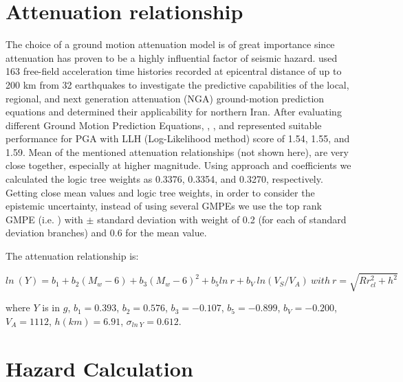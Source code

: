 \documentclass{article}
\begin{document}
\section{Attenuation relationship}
The choice of a ground motion attenuation model is of great importance since attenuation has proven to be a highly influential factor of seismic hazard. \citet{Zafarani2014} used 163 free-field acceleration time histories recorded at epicentral distance of up to 200 km from 32 earthquakes to investigate the predictive capabilities of the local, regional, and next generation attenuation (NGA) ground-motion prediction equations and determined their applicability for northern Iran. After evaluating different Ground Motion Prediction Equations, \citet{Kalkan2004}, \citet{Chiou2008}, and \citet{Boore2008} represented suitable performance for  PGA  with LLH (Log-Likelihood method) score of 1.54, 1.55, and 1.59. Mean of the mentioned attenuation relationships (not shown here), are very close together, especially at higher magnitude. Using \citet{Scherbaum2009} approach and \citet{Zafarani2014} coefficients we calculated the logic tree weights as 0.3376, 0.3354, and 0.3270, respectively. Getting close mean values and logic tree weights, in order to consider the epistemic uncertainty, instead of using several GMPEs we use the top rank GMPE (i.e.  \citet{Kalkan2004} ) with  $\pm$ standard deviation with weight of 0.2 (for each of standard deviation branches) and 0.6 for the mean value.    \\

\noindent

The attenuation relationship is:

\begin{equation}
ln\ (Y) = b_1 + b_2(M_w-6) + b_3( M_w-6)^{2}+ b_5ln\ r + b_V \ ln(V_S/V_A) \  with \  r= \sqrt{R{r^2_{cl} + h^2}}  
\end{equation}

where $Y$ is in $g$, $b_1 = 0.393$, $b_2 = 0.576$, $b_3 = -0.107$, $b_5 = -0.899$, $b_V = -0.200$, $V_A = 1112$, $h(km) = 6.91$, $\sigma_{ln\ Y} = 0.612$.




\section{Hazard Calculation}
\end{document}
